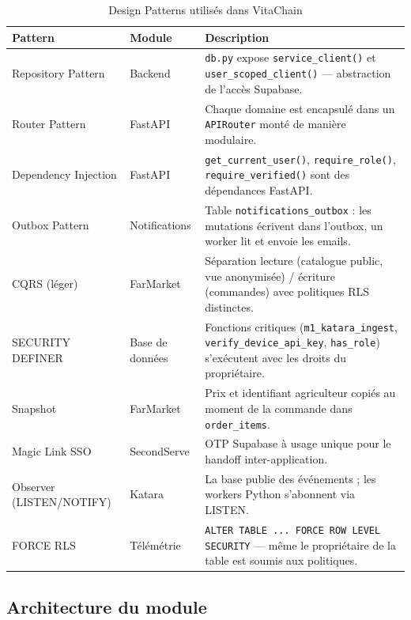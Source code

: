 \documentclass[12pt,a4paper]{report}
\newcommand{\code}[1]{\texttt{\small #1}}
\begin{document}
\begin{table}[H]
  \centering
  \caption{Design Patterns utilisés dans VitaChain}
  \label{tab:patterns}
  \small
  \begin{tabularx}{\linewidth}{llX}
    \toprule
    \textbf{Pattern} & \textbf{Module} & \textbf{Description} \\
    \midrule
    Repository Pattern
      & Backend
      & \code{db.py} expose \code{service\_client()} et
        \code{user\_scoped\_client()} --- abstraction de l'accès Supabase. \\
    Router Pattern
      & FastAPI
      & Chaque domaine est encapsulé dans un \code{APIRouter} monté
        de manière modulaire. \\
    Dependency Injection
      & FastAPI
      & \code{get\_current\_user()}, \code{require\_role()},
        \code{require\_verified()} sont des dépendances FastAPI. \\
    Outbox Pattern
      & Notifications
      & Table \code{notifications\_outbox} : les mutations écrivent dans
        l'outbox, un worker lit et envoie les emails. \\
    CQRS (léger)
      & FarMarket
      & Séparation lecture (catalogue public, vue anonymisée) / écriture
        (commandes) avec politiques RLS distinctes. \\
    SECURITY DEFINER
      & Base de données
      & Fonctions critiques (\code{m1\_katara\_ingest},
        \code{verify\_device\_api\_key}, \code{has\_role}) s'exécutent
        avec les droits du propriétaire. \\
    Snapshot
      & FarMarket
      & Prix et identifiant agriculteur copiés au moment de la commande
        dans \code{order\_items}. \\
    Magic Link SSO
      & SecondServe
      & OTP Supabase à usage unique pour le handoff inter-application. \\
    Observer (LISTEN/NOTIFY)
      & Katara
      & La base publie des événements ; les workers Python s'abonnent
        via LISTEN. \\
    FORCE RLS
      & Télémétrie
      & \code{ALTER TABLE ... FORCE ROW LEVEL SECURITY} --- même le
        propriétaire de la table est soumis aux politiques. \\
    \bottomrule
  \end{tabularx}
\end{table}

\subsection{Architecture du module}
\end{document}
